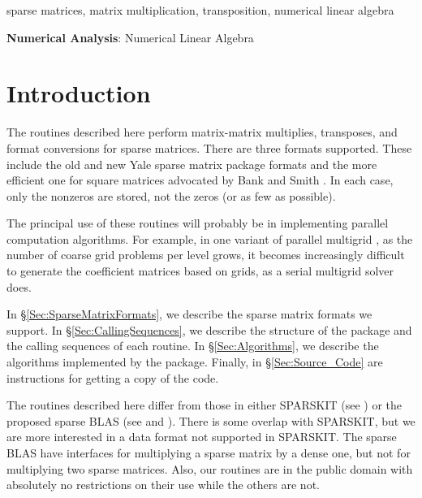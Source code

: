 \begin{keywords}
sparse matrices, matrix multiplication, transposition, numerical linear
algebra
\end{keywords}

\begin{AMSMOS}
{\bf Numerical Analysis}: Numerical Linear Algebra
\end{AMSMOS}
 
 
\section{Introduction}
\label{Sec:Introduction}
 
The routines described here perform matrix-matrix multiplies, transposes, and
format conversions for sparse matrices.  There are three formats supported.
These include the old and new Yale sparse matrix package formats 
\cite{NewYSMP,YSMP1,YSMP2} and the more
efficient one for square matrices advocated by Bank and Smith
\cite{BankSmith87}.  In each case, only the nonzeros are stored, not the zeros
(or as few as possible).
 
The principal use of these routines will probably be in implementing parallel
computation algorithms.  For example, in one variant of parallel multigrid
\cite{DouglasMiranker87,DouglasSmith88}, as the number of coarse grid problems
per level grows, it becomes increasingly difficult to generate the coefficient
matrices based on grids, as a serial multigrid solver does.
 
In \S\ref{Sec:SparseMatrixFormats}, we describe the sparse matrix formats we
support.  In \S\ref{Sec:CallingSequences}, we describe the structure of the
package and the calling sequences of each routine.  In \S\ref{Sec:Algorithms},
we describe the algorithms implemented by the package.  Finally, in
\S\ref{Sec:Source_Code} are instructions for getting a copy of the code.
 
The routines described here differ from those in either SPARSKIT (see
\cite{Saad90}) or the proposed sparse BLAS (see \cite{DuffMarrRadi92} and
\cite{Heroux}).
There is some overlap with SPARSKIT, but we are more interested in a data
format not supported in SPARSKIT.
The sparse BLAS have interfaces for multiplying a sparse matrix by a dense
one, but not for multiplying two sparse matrices.
Also, our routines are in the public domain with absolutely no restrictions
on their use while the others are not.

